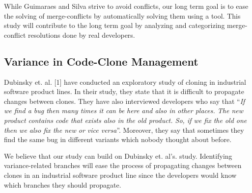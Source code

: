 While Guimaraes and Silva strive to avoid conflicts, our long term goal is to ease the solving of merge-conflicts by automatically solving them using a tool. This study will contribute to the long term goal by analyzing and categorizing merge-conflict resolutions done by real developers.

\subsection{Variance in Code-Clone Management}
Dubinsky et. al. [1] have conducted an exploratory study of cloning in industrial software product lines. In their study, they state that it is difficult to propagate changes between clones. They have also interviewed developers who say that “\textit{If we find a bug then many times it can be here and also in other places. The new product contains code that exists also in the old product. So, if we fix the old one then we also fix the new or vice versa}”. Moreover, they say that sometimes they find the same bug in different variants which nobody thought about before.

We believe that our study can build on Dubinsky et. al’s. study. Identifying variance-related branches will ease the process of propagating changes between clones in an industrial software product line since the developers would know which branches they should propagate.



